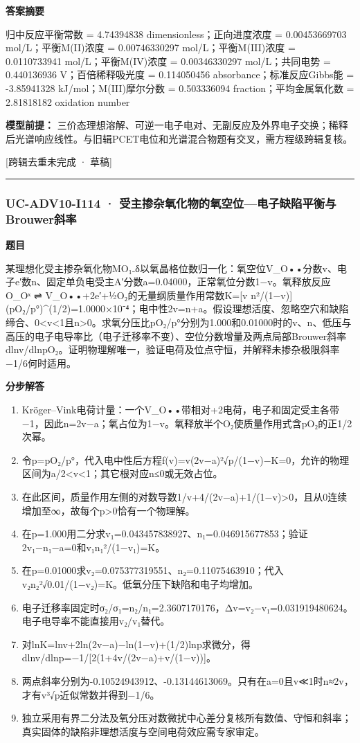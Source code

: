 \documentclass[UTF8,11pt,a4paper]{ctexart}
\begin{document}
\noindent\textbf{答案摘要}\par
归中反应平衡常数 = 4.74394838 dimensionless；正向进度浓度 = 0.00453669703 mol/L；平衡M(II)浓度 = 0.00746330297 mol/L；平衡M(III)浓度 = 0.0110733941 mol/L；平衡M(IV)浓度 = 0.00346330297 mol/L；共同电势 = 0.440136936 V；百倍稀释吸光度 = 0.114050456 absorbance；标准反应Gibbs能 = -3.85941328 kJ/mol；M(III)摩尔分数 = 0.503336094 fraction；平均金属氧化数 = 2.81818182 oxidation number\par
\noindent\textbf{模型前提：}
三价态理想溶解、可逆一电子电对、无副反应及外界电子交换；稀释后光谱响应线性。与旧辑PCET电位和光谱混合物题有交叉，需方程级跨辑复核。\par
\noindent\textcolor{red!65!black}{[跨辑去重未完成 · 草稿]} \par
\medskip\hrule\medskip
{}
\subsubsection*{UC-ADV10-I114 · 受主掺杂氧化物的氧空位—电子缺陷平衡与Brouwer斜率}
\noindent\textbf{题目}\par
某理想化受主掺杂氧化物MO₁₋δ以氧晶格位数归一化：氧空位V\_O••分数v、电子e′数n、固定单负电受主A′分数a=0.04000，正常氧位分数1−v。氧释放反应O\_Oˣ ⇌ V\_O••+2e′+½O₂的无量纲质量作用常数K=[v n²/(1−v)](pO₂/p°)\textasciicircum{}(1/2)=1.0000×10⁻⁴；电中性2v=n+a。假设理想活度、忽略空穴和缺陷缔合、0<v<1且n>0。求氧分压比pO₂/p°分别为1.000和0.01000时的v、n、低压与高压的电子电导率比（电子迁移率不变）、空位分数增量及两点局部Brouwer斜率dlnv/dlnpO₂。证明物理解唯一，验证电荷及位点守恒，并解释未掺杂极限斜率−1/6何时适用。\par
\medskip\noindent\textbf{分步解答}
\begin{enumerate}
\item Kröger–Vink电荷计量：一个V\_O••带相对+2电荷，电子和固定受主各带−1，因此n=2v−a；氧占位为1−v。氧释放半个O₂使质量作用式含pO₂的正1/2次幂。
\item 令p=pO₂/p°，代入电中性后方程f(v)=v(2v−a)²√p/(1−v)−K=0，允许的物理区间为a/2<v<1；其它根对应n≤0或无效占位。
\item 在此区间，质量作用左侧的对数导数1/v+4/(2v−a)+1/(1−v)>0，且从0连续增加至∞，故每个p>0恰有一个物理解。
\item 在p=1.000用二分求v₁=0.043457838927、n₁=0.046915677853；验证2v₁−n₁−a=0和v₁n₁²/(1−v₁)=K。
\item 在p=0.01000求v₂=0.075377319551、n₂=0.11075463910；代入v₂n₂²√0.01/(1−v₂)=K。低氧分压下缺陷和电子均增加。
\item 电子迁移率固定时σ₂/σ₁=n₂/n₁=2.3607170176，Δv=v₂−v₁=0.031919480624。电子电导率不能直接用v₂/v₁替代。
\item 对lnK=lnv+2ln(2v−a)−ln(1−v)+(1/2)lnp求微分，得dlnv/dlnp=−1/[2(1+4v/(2v−a)+v/(1−v))]。
\item 两点斜率分别为-0.10524943912、-0.13144613069。只有在a=0且v≪1时n≈2v，才有v³√p近似常数并得到−1/6。
\item 独立采用有界二分法及氧分压对数微扰中心差分复核所有数值、守恒和斜率；真实固体的缺陷非理想活度与空间电荷效应需专家审定。
\end{enumerate}
\end{document}
